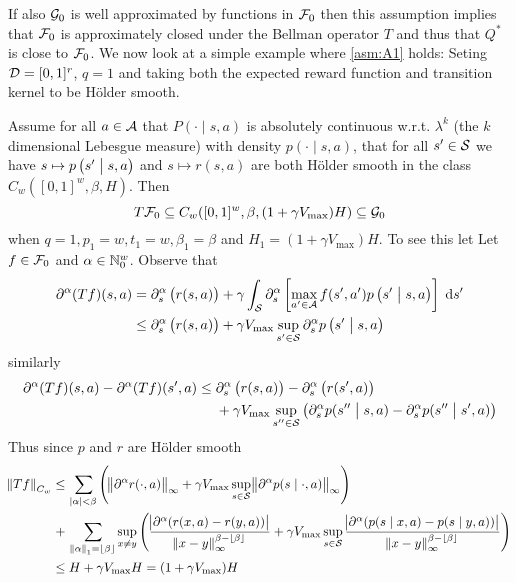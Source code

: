 If also $\mathcal{G}_0$ is well approximated by functions in $\mathcal{F}_0$
then this assumption implies that $\mathcal{F}_0$ is approximately closed
under the Bellman operator $T$ and thus that $Q^*$ is close to $\mathcal{F}_0$.
We now look at a simple example where \cref{asm:A1} holds:
Seting $\mathcal{D}=[0,1]^r$, $q=1$ 
and taking both the expected reward function and transition kernel
to be Hölder smooth.

\begin{example}
  Assume for all $a \in \mathcal{A}$ that
  $P(\cdot \mid s,a)$ is absolutely continuous w.r.t. $\lambda^k$
  (the $k$ dimensional Lebesgue measure)
  with density $p(\cdot \mid s, a)$,
  that for all $s' \in \mathcal{S}$ we have
  $s \mapsto p\left(s' \;\middle\vert\; s, a \right)$
  and $s \mapsto r(s, a)$ are both Hölder smooth in the class
  $C_w([0,1]^w, \beta, H)$.
  Then
  \[ T \mathcal{F}_0 \subseteq C_w([0,1]^w, \beta, (1 + \gamma V_{\max}) H)
  \subseteq \mathcal{G}_0 \] 
  when $q=1, p_1 = w, t_1 = w, \beta_1 = \beta$ and $H_1 =
  (1 + \gamma V_{\max}) H$.
  To see this let
  Let $f \in \mathcal{F}_0$ and $\alpha \in \mathbb{N}_0^w$.
  Observe that
  \begin{align*}
    \partial^\alpha (Tf)(s, a)
    = & \; \partial^\alpha_s \left( r(s, a) \right)
    + \gamma \int_{\mathcal{S}}\partial^\alpha_s \left[ \max_{a' \in \mathcal{A}}
    f(s', a') p\left(s' \;\middle\vert\; s, a\right) \right] \; \mathrm{d} s' 
    \\ \leq & \; \partial^\alpha_s \left( r(s, a) \right)
    + \gamma V_{\max} \sup_{s' \in \mathcal{S}} \partial_s^\alpha
    p\left(s' \;\middle\vert\; s, a\right)
  \end{align*}
  similarly
  \begin{align*}
    \partial^\alpha (Tf)(s, a) - \partial^\alpha (Tf)(s', a)
    \leq & \; \partial^\alpha_s \left( r(s, a) \right)
    - \partial^\alpha_s \left( r(s', a) \right)
    \\ & \; + \gamma V_{\max} \sup_{s'' \in \mathcal{S}}
    \left( \partial_s^\alpha p(s'' \;\middle\vert\; s, a)
    - \partial_s^\alpha p(s'' \;\middle\vert\; s', a) \right)
  \end{align*}
  Thus since $p$ and $r$ are Hölder smooth
  \begin{align*}
    \norm{Tf}_{C_w} \leq & \; \sum_{\abs{\alpha}<\beta} \left(
      \norm{\partial^\alpha r(\cdot, a)}_\infty
      + \gamma V_{\max} \sup_{s \in \mathcal{S}} \norm{\partial^\alpha
    p(s \mid \cdot, a)}_\infty \right)
    \\ + & \; \sum_{\norm{\alpha}_1 = \lfloor\beta\rfloor} \sup_{x \neq y}
    \left(
      \frac{\abs{\partial^\alpha (r(x, a) - r(y, a))}}
      {\norm{x - y}_{\infty}^{\beta - \lfloor\beta\rfloor}}
      + \gamma V_{\max} \sup_{s \in \mathcal{S}} \frac{
      \abs{\partial^\alpha (p(s \mid x, a) - p(s \mid y, a))}}
      {\norm{x - y}_{\infty}^{\beta - \lfloor\beta\rfloor}}
    \right)
    \\ \leq & \; H + \gamma V_{\max} H = (1 + \gamma V_{\max}) H
  \end{align*}
  
\end{example}

